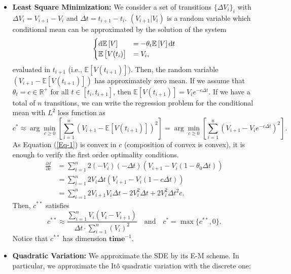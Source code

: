 \documentclass[11pt]{article}
\theoremstyle{definition}
\newcommand{\E}{\mathbb{E}}
\newcommand{\R}{\mathbb{R}}
\begin{document}
\begin{itemize}

\item \textbf{Least Square Minimization:} We consider a set of transitions $\{\Delta V_i\}_{i}$ with $\Delta V_i=V_{i+1}-V_i$ and $\Delta t=t_{i+1}-t_i$. $(V_{i+1}|V_i)$ is a random variable which conditional mean can be approximated by the solution of the system
\begin{equation*}
\begin{cases}
\dif \E\left[V\right]&=-\theta_t\E\left[V\right]\dif t\\
\E\left[V(t_i)\right]&=V_i,
\end{cases}
\end{equation*}
evaluated in $t_{i+1}$ (i.e., $\E\left[V(t_{i+1})\right]$). Then, the random variable $(V_{i+1}-\E\left[V(t_{i+1})\right])$ has approximately zero mean. If we assume that $\theta_t=c\in\R^+$ for all $t\in[t_i,t_{i+1}]$, then $\E\left[V(t_{i+1})\right]=V_ie^{-c\Delta t}$. If we have a total of $n$ transitions, we can write the regression problem for the conditional mean with $L^2$ loss function as
\begin{equation}
c^*\approx\arg\min_{c\geq0}\left[\sum_{i=1}^n\left(V_{i+1}-\E\left[V(t_{i+1})\right]\right)^2\right]=\arg\min_{c\geq0}\left[\sum_{i=1}^n\left(V_{i+1}-V_ie^{-c\Delta t}\right)^2\right].
\label{Eq-1}
\end{equation}
As Equation (\ref{Eq-1}) is convex in $c$ (composition of convex is convex), it is enough to verify the first order optimality conditions.
\begin{equation*}
\begin{split}
\frac{\partial f}{\partial c}&=\sum_{i=1}^n2(-V_i)(-\Delta t)(V_{i+1}-V_i(1-\theta_0\Delta t))\\
&=\sum_{i=1}^n2V_i\Delta t(V_{i+1}-V_i(1-c\Delta t))\\
&=\sum_{i=1}^n2V_{i+1}V_i\Delta t-2V_i^2\Delta t+2V_i^2\Delta t^2c.
\end{split}
\end{equation*}
Then, $c^{**}$ satisfies
\begin{equation}
c^{**}\approx\frac{\sum_{i=1}^nV_i(V_i-V_{i+1})}{\Delta t\cdot\sum_{i=1}^n(V_i)^2}\quad\text{and}\quad c^*=\max\{c^{**},0\}.
\label{Eq-4}
\end{equation}
Notice that $c^{**}$ has dimension $\mathbf{time}^{-1}$.

\item \textbf{Quadratic Variation:} We approximate the SDE by its E-M scheme. In particular, we approximate the It\^o quadratic variation with the discrete one:
\begin{itemize}


\end{itemize}
\end{itemize}
\end{document}
